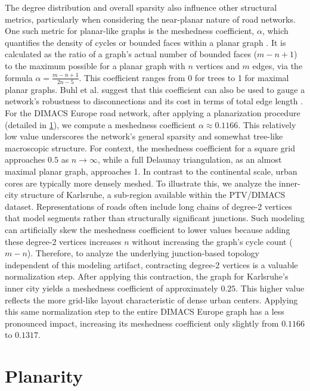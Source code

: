 The degree distribution and overall sparsity also influence other structural metrics, particularly when considering the near-planar nature of road networks.
One such metric for planar-like graphs is the meshedness coefficient, \(\alpha\), which quantifies the density of cycles or bounded faces within a planar graph \cite{buhl_topological_2006}.
It is calculated as the ratio of a graph's actual number of bounded faces (\(m - n + 1\)) to the maximum possible for a planar graph with \(n\) vertices and \(m\) edges, via the formula \(\alpha = \frac{m - n + 1}{2n - 5}\).
This coefficient ranges from 0 for trees to 1 for maximal planar graphs.
Buhl et al. suggest that this coefficient can also be used to gauge a network's robustness to disconnections and its cost in terms of total edge length \cite{buhl_topological_2006}.
For the DIMACS Europe road network, after applying a planarization procedure (detailed in \cref{sec:approach:planarity}), we compute a meshedness coefficient \(\alpha \approx 0.1166\).
This relatively low value underscores the network's general sparsity and somewhat tree-like macroscopic structure.
For context, the meshedness coefficient for a square grid approaches \(0.5\) as \(n \to \infty\), while a full Delaunay triangulation, as an almost maximal planar graph, approaches 1.
In contrast to the continental scale, urban cores are typically more densely meshed.
To illustrate this, we analyze the inner-city structure of Karlsruhe, a sub-region available within the PTV/DIMACS dataset.
Representations of roads often include long chains of degree-2 vertices that model segments rather than structurally significant junctions.
Such modeling can artificially skew the meshedness coefficient to lower values because adding these degree-2 vertices increases \(n\) without increasing the graph's cycle count (\(m-n\)).
Therefore, to analyze the underlying junction-based topology independent of this modeling artifact, contracting degree-2 vertices is a valuable normalization step.
After applying this contraction, the graph for Karlsruhe's inner city yields a meshedness coefficient of approximately \(0.25\).
This higher value reflects the more grid-like layout characteristic of dense urban centers.
Applying this same normalization step to the entire DIMACS Europe graph has a less pronounced impact, increasing its meshedness coefficient only slightly from \(0.1166\) to \(0.1317\).

\section{Planarity}
\label{sec:approach:planarity}

